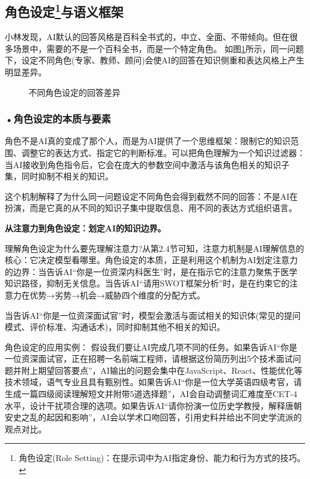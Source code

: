 \subsection[角色设定与语义框架]{\textbf{角色设定}\footnote{角色设定(Role Setting)：在提示词中为AI指定身份、能力和行为方式的技巧。}与语义框架}

小林发现，AI默认的回答风格是百科全书式的，中立、全面、不带倾向。但在很多场景中，需要的不是一个百科全书，而是一个特定角色。 如图\ref{fig:ch3_3_4}所示，同一问题下，设定不同角色(专家、教师、顾问)会使AI的回答在知识侧重和表达风格上产生明显差异。

\begin{figure}[H]
\centering
{}
\caption{不同角色设定的回答差异}
\label{fig:ch3_3_4}
\end{figure}

\subsubsection*{\textbf{•角色设定的本质与要素}}


角色不是AI真的变成了那个人，而是为AI提供了一个思维框架：限制它的知识范围、调整它的表达方式、指定它的判断标准。可以把角色理解为一个知识过滤器：当AI接收到角色指令后，它会在庞大的参数空间中激活与该角色相关的知识子集，同时抑制不相关的知识。

这个机制解释了为什么同一问题设定不同角色会得到截然不同的回答：不是AI在扮演，而是它真的从不同的知识子集中提取信息、用不同的表达方式组织语言。
\begin{funbox}
\textbf{从注意力到角色设定：划定AI的知识边界。} 

理解角色设定为什么要先理解注意力?从第2.4节可知，注意力机制是AI理解信息的核心：它决定模型看哪里。角色设定的本质，正是利用这个机制为AI划定注意力的边界：当告诉AI“你是一位资深内科医生”时，是在指示它的注意力聚焦于医学知识路径，抑制无关信息。当告诉AI“请用SWOT框架分析”时，是在约束它的注意力在优势→劣势→机会→威胁四个维度的分配方式。


\end{funbox}

当告诉AI“你是一位资深面试官”时，模型会激活与面试相关的知识体(常见的提问模式、评价标准、沟通话术)，同时抑制其他不相关的知识。

角色设定的应用实例：
假设我们要让AI完成几项不同的任务。如果告诉AI“你是一位资深面试官，正在招聘一名前端工程师，请根据这份简历列出5个技术面试问题并附上期望回答要点”，AI输出的问题会集中在JavaScript、React、性能优化等技术领域，语气专业且具有甄别性。如果告诉AI“你是一位大学英语四级考官，请生成一篇四级阅读理解短文并附带5道选择题”，AI会自动调整词汇难度至CET-4水平，设计干扰项合理的选项。如果告诉AI“请你扮演一位历史学教授，解释唐朝安史之乱的起因和影响”，AI会以学术口吻回答，引用史料并给出不同史学流派的观点对比。

